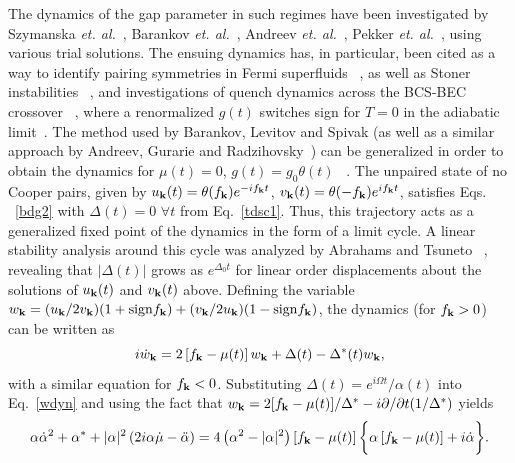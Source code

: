 \documentclass[aps,pra,floats,epsfig,pdflatex]{revtex4}                                                              %
\begin{document}
 {The dynamics of the gap parameter in such regimes have been investigated by Szymanska \textit{et. al.}}~\cite{szymanska},  {Barankov \textit{et. al.}}~\cite{barankov}, {Andreev \textit{et. al.}}~\cite{andreev:noneqmbcsbec}, {Pekker \textit{et. al.}}~\cite{pekker},  {using various trial solutions. The ensuing dynamics has, in particular, been cited as a way to identify pairing symmetries in Fermi superfluids}~\cite{pekker,ourpaper} {, as well as Stoner instabilities}~\cite{stoner} {, and investigations of quench dynamics across the BCS-BEC crossover}~\cite{stoner} {, where a renormalized $g(t)$ switches sign for $T=0$ in the adiabatic limit}~\cite{bcsbec}.  { The method  used by Barankov, Levitov and Spivak (as well as a similar approach by Andreev, Gurarie and Radzihovsky}~\cite{andreev:noneqmbcsbec}) {can be generalized in order to obtain the dynamics for $\mu(t)=0$, $g(t)=g_0\theta(t)$}~\cite{barankov} {. The unpaired state of no Cooper pairs, given by  $u_{\bf k}(t)=\theta(f_{\bf k}) 
e^{-if_{\bf k}t}$, $v_{\bf k}(t)=\theta(
-f_{\bf k}) e^{if_{\bf k}t}$, satisfies Eqs.}
~\ref{bdg2}  {with $\Delta(t)=0$ $\forall t$ from Eq.}~\ref{tdsc1}.
 {Thus, this trajectory acts as a generalized fixed point of the dynamics in the form of a limit cycle. A linear stability analysis around this cycle was analyzed by Abrahams and Tsuneto}~\cite{abrahams} {, revealing that $|\Delta(t)|$ grows as $e^{\Delta_0 t}$ for linear order displacements about the solutions of $u_{\bf k}(t)$ and $v_{\bf k}(t)$ above. Defining the variable
$w_{\bf k}=(u_{\bf k}/2v_{\bf k})(1+{\rm sign}f_{\bf k})+(v_{\bf k}/2u_{\bf k})(1-{\rm sign}f_{\bf k})$, the dynamics (for $f_{\bf k}>0$) can be written as}
\begin{equation}
\label{wdyn}
i \dot{w}_{\bf k}= 2\left[f_{\bf k}-\mu(t)\right] w_{\bf k} + \Delta(t) - \Delta^\ast(t)w_{\bf k},
\end{equation}
 {with a similar equation for  $f_{\bf k}<0$. Substituting $\Delta(t)=e^{i\Omega t}/\alpha(t)$ into Eq.}~\ref{wdyn} { and using
the fact that $w_{\bf k}=2[f_{\bf k}-\mu(t)]/\Delta^\ast-i\partial/\partial t (1/\Delta^\ast)$ yields}
\begin{equation}
\label{alphadyn}
\alpha\dot{\alpha}^2+\alpha^\ast+|\alpha|^2\left(2i\alpha\dot{\mu}-\ddot{\alpha}\right)=4\left(\alpha^2-|\alpha|^2\right)\left[f_{\bf k}-\mu(t)\right]\bigg\{\alpha\left[f_{\bf k}-\mu(t)\right]+i\dot{\alpha}\bigg\}.
\end{equation}
\end{document}
